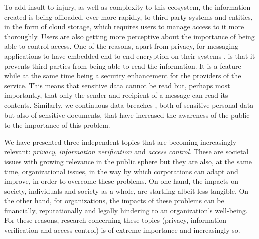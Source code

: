 To add insult to injury, as well as complexity to this ecosystem, the information created is being offloaded, ever more rapidly, to third-party systems and entities, in the form of cloud storage, which requires users to manage access to it more thoroughly. Users are also getting more perceptive about the importance of being able to control access. One of the reasons, apart from privacy, for messaging applications to have embedded end-to-end encryption on their systems \cite{rosler_more_2017}, is that it prevents third-parties from being able to read the information. It is a feature while at the same time being a security enhancement for the providers of the service. This means that sensitive data cannot be read but, perhaps most importantly, that only the sender and recipient of a message can read its contents. Similarly, we continuous data breaches \cite{edwards_hype_2016}, both of sensitive personal data but also of sensitive documents, that have increased the awareness of the public to the importance of this problem.

We have presented three independent topics that are becoming increasingly relevant: \textit{privacy}, \textit{information verification} and \textit{access control}. These are societal issues with growing relevance in the public sphere but they are also, at the same time, organizational issues, in the way by which corporations can adapt and improve, in order to overcome these problems. On one hand, the impacts on society, individuals and society as a whole, are startling albeit less tangible. On the other hand, for organizations, the impacts of these problems can be financially, reputationally and legally hindering to an organization's well-being. For these reasons, research concerning these topics (privacy, information verification and access control) is of extreme importance and increasingly so.

